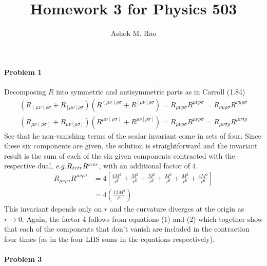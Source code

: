 \documentclass[10pt]{scrartcl}
\title{Homework 3 for Physics  503}
\author{Ashok M. Rao}
\newcommand{\eg}{{\textit e.g.}}
\begin{document}
\maketitle
{}
\paragraph{Problem 1}
 Decomposing $R$ into symmetric and antisymmetric parts as in Carroll (1.84)
\begin{align}
\left(R_{(\mu\nu)\rho\sigma} + R_{[\mu\nu]\rho\sigma}\right)\left(R^{(\mu\nu)\rho\sigma} + R^{[\mu\nu]\rho\sigma}\right) = R_{\mu\nu\rho\sigma}R^{\mu\nu\rho\sigma}	 =  R_{\nu\mu\rho\sigma}R^{\nu\mu\rho\sigma}	\\
\left(R_{\mu\nu(\rho\sigma)} + R_{\mu\nu[\rho\sigma]}\right)\left(R^{\mu\nu(\rho\sigma)} + R^{\mu\nu[\rho\sigma]}\right) = R_{\mu\nu\rho\sigma}R^{\mu\nu\rho\sigma}	 =  R_{\mu\nu\sigma\rho}R^{\mu\nu\sigma\rho}		
\end{align}
See that he non-vanishing terms of the scalar invariant come in sets of four. Since these six components are given, the solution is straightforward and the invariant result is the sum of each of the six given components contracted with the respective dual, $\eg R_{t r t r}R^{t r t r}$, with an additional factor of 4. 
\begin{align}
	R_{\mu\nu\rho\sigma}R^{\mu\nu\rho\sigma} &= 4\left[\frac{4M^2}{r^6} +\frac{M^2}{r^6} + \frac{M^2}{r^6} + \frac{M^2}{r^6} + \frac{M^2}{r^6} + \frac{4M^2}{r^6}\right]\\
	&= 4\left(\frac{12M^2}{r^6}\right)
\end{align}
This invariant depends only on $r$ and the curvature diverges at the origin as $r\to 0$. Again, the factor 4 follows from equations (1) and (2) which together show that each of the components that don't vanish are included in the contraction four times (as in the four LHS sums in the equations respectively).


\paragraph{Problem 3}
\end{document}
